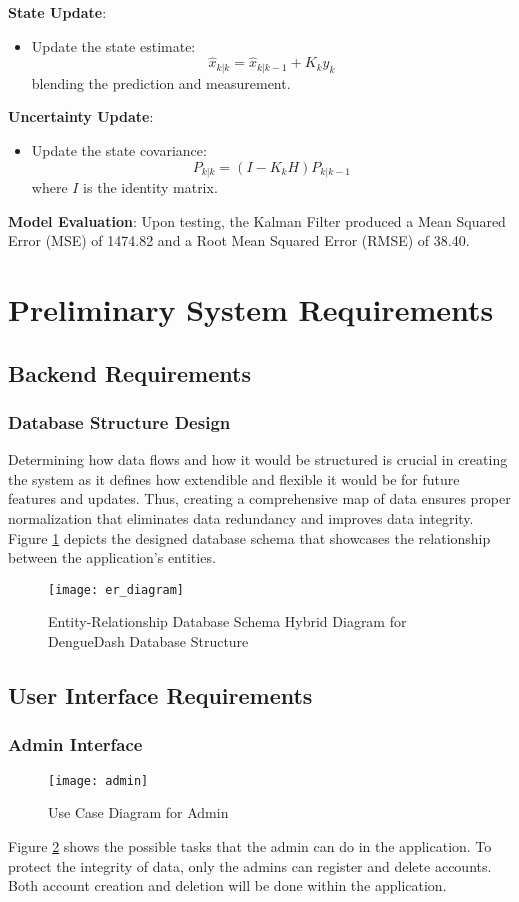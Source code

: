 \textbf{State Update}:
\begin{itemize}
	\item Update the state estimate:
	\[
	\hat{x}_{k|k} = \hat{x}_{k|k-1} + K_k y_k
	\]
	blending the prediction and measurement.
\end{itemize}

\textbf{Uncertainty Update}:
\begin{itemize}
	\item Update the state covariance:
	\[
	P_{k|k} = (I - K_k H) P_{k|k-1}
	\]
	where \( I \) is the identity matrix.
\end{itemize}

\textbf{Model Evaluation}:
Upon testing, the Kalman Filter produced a Mean Squared Error (MSE) of 1474.82 and a Root Mean Squared Error (RMSE) of 38.40.

\clearpage
\section{Preliminary System Requirements}
\subsection{Backend Requirements}
\subsubsection{Database Structure Design}
Determining how data flows and how it would be structured is crucial in creating the system as it defines how extendible and flexible it would be for future features and updates. Thus, creating a comprehensive map of data ensures proper normalization that eliminates data redundancy and improves data integrity. Figure \ref{fig:er_diagram} depicts the designed database schema that showcases the relationship between the application's entities. 
\begin{figure}[H]
	\centering
	\texttt{[image: er\_diagram]}
	\caption{Entity-Relationship Database Schema Hybrid Diagram for DengueDash Database Structure}
	\label{fig:er_diagram}
\end{figure}

\subsection{User Interface Requirements}
\subsubsection{Admin Interface}
\begin{figure}[H]
	\centering
	\texttt{[image: admin]}
	\caption{Use Case Diagram for Admin}
	\label{fig:admin-use-case}
\end{figure}
Figure \ref{fig:admin-use-case} shows the possible tasks that the admin can do in the application. To protect the integrity of data, only the admins can register and delete accounts. Both account creation and deletion will be done within the application.

